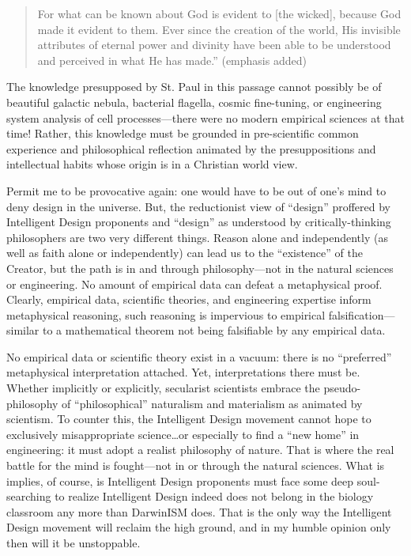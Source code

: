 \begin{quote}
For what can be known about God is evident to [the wicked], because God made it evident to them. Ever since the creation of the world, His invisible attributes of eternal power and divinity have been able to be understood and perceived in what He has made.'' (emphasis added)
\end{quote}

The knowledge presupposed by St. Paul in this passage cannot possibly be of beautiful galactic nebula, bacterial flagella, cosmic fine-tuning, or engineering system analysis of cell processes---there were no modern empirical sciences at that time! Rather, this knowledge must be grounded in pre-scientific common experience and philosophical reflection animated by the presuppositions and intellectual habits whose origin is in a Christian world view.

Permit me to be provocative again: one would have to be out of one’s mind to deny design in the universe. But, the reductionist view of ``design'' proffered by Intelligent Design proponents and ``design'' as understood by critically-thinking philosophers are two very different things. Reason alone and independently (as well as faith alone or independently) can lead us to the ``existence'' of the Creator, but the path is in and through philosophy---not in the natural sciences or engineering. No amount of empirical data can defeat a metaphysical proof. Clearly, empirical data, scientific theories, and engineering expertise inform metaphysical reasoning, such reasoning is impervious to empirical falsification---similar to a mathematical theorem not being falsifiable by any empirical data.

No empirical data or scientific theory exist in a vacuum: there is no ``preferred'' metaphysical interpretation attached. Yet, interpretations there must be. Whether implicitly or explicitly, secularist scientists embrace the pseudo-philosophy of ``philosophical'' naturalism and materialism as animated by scientism. To counter this, the Intelligent Design movement cannot hope to exclusively misappropriate science\ldots or especially to find a ``new home'' in engineering: it must adopt a realist philosophy of nature. That is where the real battle for the mind is fought---not in or through the natural sciences. What is implies, of course, is Intelligent Design proponents must face some deep soul-searching to realize Intelligent Design indeed does not belong in the biology classroom any more than DarwinISM does. That is the only way the Intelligent Design movement will reclaim the high ground, and in my humble opinion only then will it be unstoppable.

